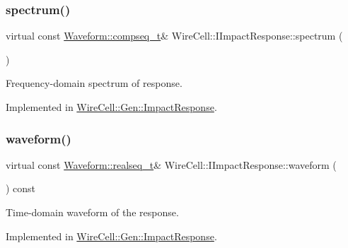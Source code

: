 \subsubsection{\texorpdfstring{spectrum()}{spectrum()}}
{\footnotesize\ttfamily virtual const \hyperlink{namespace_wire_cell_1_1_waveform_a7e4a8d371f774438bb360e7d1dcb583a}{Waveform\+::compseq\+\_\+t}\& Wire\+Cell\+::\+I\+Impact\+Response\+::spectrum (\begin{DoxyParamCaption}{ }\end{DoxyParamCaption})\hspace{0.3cm}{\ttfamily [pure virtual]}}



Frequency-\/domain spectrum of response. 



Implemented in \hyperlink{class_wire_cell_1_1_gen_1_1_impact_response_a8bd5c0dbe10911359e29892d4f1380c1}{Wire\+Cell\+::\+Gen\+::\+Impact\+Response}.

\mbox{\label{class_wire_cell_1_1_i_impact_response_a3f4821a846e98daf92768e33e795df8d}} 
\subsubsection{\texorpdfstring{waveform()}{waveform()}}
{\footnotesize\ttfamily virtual const \hyperlink{namespace_wire_cell_1_1_waveform_a479175e541c8545e87cd8063b74b6956}{Waveform\+::realseq\+\_\+t}\& Wire\+Cell\+::\+I\+Impact\+Response\+::waveform (\begin{DoxyParamCaption}{ }\end{DoxyParamCaption}) const\hspace{0.3cm}{\ttfamily [pure virtual]}}



Time-\/domain waveform of the response. 



Implemented in \hyperlink{class_wire_cell_1_1_gen_1_1_impact_response_a50a66f592c1eb71279cbf6981fd5f8e5}{Wire\+Cell\+::\+Gen\+::\+Impact\+Response}.

\mbox{\label{class_wire_cell_1_1_i_impact_response_ae706c2b62577ed856bfdb6d9453b9d98}} 
